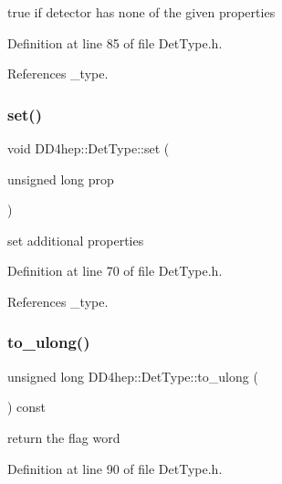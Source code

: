 true if detector has none of the given properties 



Definition at line 85 of file Det\+Type.\+h.



References \+\_\+type.

\hypertarget{class_d_d4hep_1_1_det_type_ada4a0d1afa3bfa7e8d135b52af921dd3}{}\label{class_d_d4hep_1_1_det_type_ada4a0d1afa3bfa7e8d135b52af921dd3} 
\subsubsection{\texorpdfstring{set()}{set()}}
{\footnotesize\ttfamily void D\+D4hep\+::\+Det\+Type\+::set (\begin{DoxyParamCaption}\item[{unsigned long}]{prop }\end{DoxyParamCaption})\hspace{0.3cm}{\ttfamily [inline]}}



set additional properties 



Definition at line 70 of file Det\+Type.\+h.



References \+\_\+type.

\hypertarget{class_d_d4hep_1_1_det_type_ad56a0a94170105ef04004888071b8b8f}{}\label{class_d_d4hep_1_1_det_type_ad56a0a94170105ef04004888071b8b8f} 
\subsubsection{\texorpdfstring{to\+\_\+ulong()}{to\_ulong()}}
{\footnotesize\ttfamily unsigned long D\+D4hep\+::\+Det\+Type\+::to\+\_\+ulong (\begin{DoxyParamCaption}{ }\end{DoxyParamCaption}) const\hspace{0.3cm}{\ttfamily [inline]}}



return the flag word 



Definition at line 90 of file Det\+Type.\+h.



